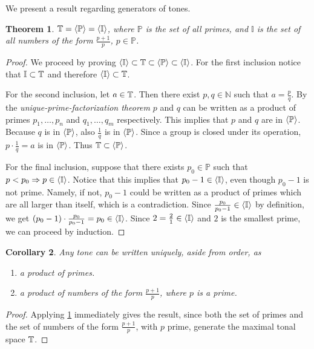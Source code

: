 \documentclass[a4paper]{book}
\newtheorem{theorem}{Theorem}[chapter]
\newtheorem{corollary}[theorem]{Corollary}
\theoremstyle{definition}
\begin{document}
We present a result regarding generators of tones.

\newcommand{\Primes}{\mathbb{P}}
\newcommand{\I}{\mathbb{I}}

\begin{theorem}
    $\Q = \gen{\Primes} = \gen{\I}$, where $\Primes$ is the set of all primes, and $\I$ is the set of all numbers of the form $\frac{p+1}{p}$, $p \in \Primes$.
    \label{thm_generator_equivalence}
\end{theorem}
\begin{proof}
    We proceed by proving $\gen{\I} \subset \Q \subset \gen{\Primes} \subset \gen{\I}$.
    For the first inclusion notice that $\I \subset \Q$ and therefore $\gen{\I} \subset \Q$.

    For the second inclusion, let $a \in \mathbb{T}$.
    Then there exist $p,q \in \mathbb{N}$ such that $a = \frac{p}{q}$.
    By the \emph{unique-prime-factorization theorem} $p$ and $q$ can be written as a product of primes $p_1,\dots,p_n$ and $q_1,\dots,q_m$ respectively.
    This implies that $p$ and $q$ are in $\gen{\Primes}$.
    Because $q$ is in $\gen{\Primes}$, also $\frac{1}{q}$ is in $\gen{\Primes}$.
    Since a group is closed under its operation, $p\cdot \frac{1}{q} = a$ is in $\gen{\Primes}$.
    Thus $\Q \subset \gen{\Primes}$.

    For the final inclusion, suppose that there exists $p_0 \in \Primes$ such that $p < p_0 \Rightarrow p \in \gen{\I}$.
    Notice that this implies that $p_0-1 \in \gen{\I}$, even though $p_0 -1$ is not prime.
    Namely, if not, $p_0 - 1$ could be written as a product of primes which are all larger than itself, which is a contradiction.
    Since $\frac{p_0}{p_0-1} \in \gen{\I}$ by definition, we get $(p_0 -1) \cdot \frac{p_0}{p_0-1} = p_0 \in \gen{\I}$.
    Since $2 = \frac{2}{1} \in \gen{\I}$ and $2$ is the smallest prime, we can proceed by induction.
\end{proof}

\begin{corollary}
    Any tone can be written uniquely, aside from order, as 
    \begin{enumerate}[i]
        \item a product of primes.
        \item a product of numbers of the form $\frac{p+1}{p}$, where $p$ is a prime.
    \end{enumerate}
\end{corollary}
\begin{proof}
    Applying \ref{thm_generator_equivalence} immediately gives the result, since both the set of primes and the set of numbers of the form $\frac{p+1}{p}$, with $p$ prime, generate the maximal tonal space $\mathbb{T}$.
\end{proof}
\end{document}
